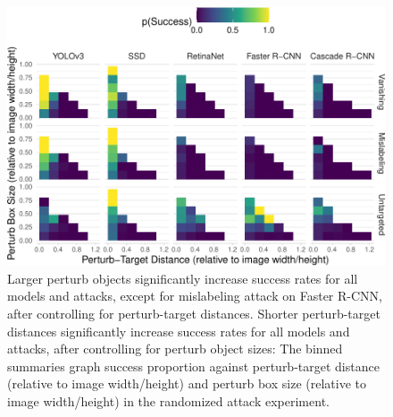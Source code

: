 \documentclass[
]{article}
\begin{document}
\begin{figure}[tb]

{\centering \includegraphics{imgs/perturb_bbox_and_object_dist_graph-1} 

}

\caption{Larger perturb objects significantly increase success rates for all models and attacks, except for mislabeling attack on Faster R-CNN, after controlling for perturb-target distances. Shorter perturb-target distances significantly increase success rates for all models and attacks, after controlling for perturb object sizes:  The binned summaries graph success proportion against perturb-target distance (relative to image width/height) and perturb box size (relative to image width/height) in the randomized attack experiment.}\label{fig:perturb_bbox_and_object_dist_graph}
\end{figure}

\begingroup\fontsize{9}{11}\selectfont
\end{document}
